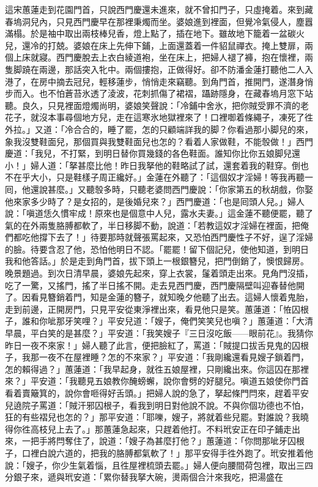這宋蕙蓮走到花園門首，只說西門慶還未進來，{}就不曾扣門子，只虛掩着。來到藏春塢洞兒內，只見西門慶早在那裡秉燭而坐。婆娘進到裡面，但覺冷氣侵人，塵囂滿榻。於是袖中取出兩枝棒兒香，燈上點了，插在地下。雖故地下籠着一盆碳火兒，還冷的打兢。婆娘在床上先伸下鋪，上面還蓋着一件貂鼠禪衣。掩上雙扉，兩個上床就寢。西門慶脫去上衣白綾道袍，坐在床上，把婦人褪了褲，抱在懷裡，兩隻脚蹺在兩邊，那話突入牝中。兩個摟抱，正做得好。卻不防潘金蓮打聽他二人入港了，在房中摘去冠兒，輕移蓮步，悄悄走來竊聽。到角門首，推開門，遂潛身悄步而入。也不怕蒼苔氷透了淩波，花刺抓傷了裙褶，躡跡隱身，在藏春塢月窓下站聽。{}良久，只見裡面燈燭尚明，婆娘笑聲說：「冷鋪中舍氷，把你賊受罪不濟的老花子，{}就沒本事尋個地方兒，走在這寒氷地獄裡來了！口裡啣着條繩子，凍死了徃外拉。」又道：「冷合合的，睡了罷，怎的只顧端詳我的脚？你看過那小脚兒的來，象我沒雙鞋面兒，那個買與我雙鞋面兒也怎的？{}看着人家做鞋，不能彀做！」西門慶道：「我兒，不打緊，到明日替你買幾錢的各色鞋面。誰知你比你五娘脚兒還小！」{}婦人道：「拏甚麼比他！昨日我拏他的鞋略試了試，還套着我的鞋穿。倒也不在乎大小，只是鞋樣子周正纔好。」{}金蓮在外聽了：「這個奴才淫婦！等我再聽一囘，他還說甚麼。」又聽彀多時，只聽老婆問西門慶說：「你家第五的秋胡戲，你娶他來家多少時了？是女招的，是後婚兒來？」西門慶道：「也是囘頭人兒。」婦人說：「嗔道恁久慣牢成！原來也是個意中人兒，露水夫妻。」這金蓮不聽便罷，聽了氣的在外兩隻胳膊都軟了，半日移脚不動，{}說道：「若教這奴才淫婦在裡面，把俺們都吃他撐下去了！」待要那時就聲張罵起來，又恐怕西門慶性子不好，逞了淫婦的臉。待要含忍了他，恐怕他明日不認。「罷罷！留下個記兒，使他知道，到明日我和他答話。」於是走到角門首，拔下頭上一根銀簪兒，把門倒銷了，懊恨歸房。晚景題過。到次日清早晨，婆娘先起來，穿上衣裳，鬔着頭走出來。見角門沒插，吃了一驚，又搖門，搖了半日搖不開。走去見西門慶，西門慶隔壁叫迎春替他開了。因看見簪銷着門，知是金蓮的簪子，就知晚夕他聽了出去。這婦人懷着鬼胎，走到前邊，正開房門，只見平安從東淨裡出來，看見他只是笑。蕙蓮道：「恠囚根子，誰和你呲那牙笑哩？」平安兒道：「嫂子，俺們笑笑兒也嗔？」蕙蓮道：「大清早晨，平白笑的是甚麼？」平安道：「我笑嫂子『三日沒吃飯——眼前花』。我猜你昨日一夜不來家！」{}婦人聽了此言，便把臉紅了，罵道：「賊提口拔舌見鬼的囚根子，我那一夜不在屋裡睡？怎的不來家？」平安道：「我剛纔還看見嫂子鎖着門，怎的賴得過？」蕙蓮道：「我早起身，就徃五娘屋裡，只剛纔出來。你這囚在那裡來？」平安道：「我聽見五娘教你醃螃蠏，說你會劈的好腿兒。嗔道五娘使你門首看着賣簸箕的，說你會咂得好舌頭。」{}把婦人說的急了，拏起條門閂來，趕着平安兒遶院子罵道：「賊汗邪囚根子，看我到明日對他說不說。不與你個功德也不怕，狂的有些褶兒也怎的？」那平安道：「耶嚛，嫂子，將就着些兒罷。對誰說？{}我曉得你徃高枝兒上去了。」那蕙蓮急起來，只趕着他打。不料玳安正在印子鋪走出來，一把手將閂奪住了，說道：「嫂子為甚麼打他？」蕙蓮道：「你問那呲牙囚根子，口裡白說六道的，把我的胳膊都氣軟了！」那平安得手徃外跑了。玳安推着他說：「嫂子，你少生氣着惱，且徃屋裡梳頭去罷。」婦人便向腰間荷包裡，取出三四分銀子來，遞與玳安道：「累你替我拏大碗，燙兩個合汁來我吃，把湯盛在